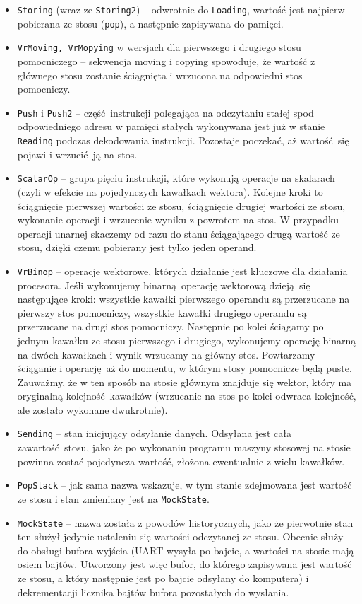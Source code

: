 \begin{itemize}
  \item \texttt{Storing} (wraz ze \texttt{Storing2}) -- odwrotnie do \texttt{Loading}, wartość jest najpierw pobierana ze stosu (\texttt{pop}), a następnie zapisywana do pamięci.
  \item \texttt{VrMoving, VrMopying} w wersjach dla pierwszego i drugiego stosu pomocniczego -- sekwencja moving i copying spowoduje, że wartość z głównego stosu zostanie ściągnięta i wrzucona na odpowiedni stos pomocniczy.
  \item \texttt{Push} i \texttt{Push2} -- część instrukcji polegająca na odczytaniu stałej spod odpowiedniego adresu w pamięci stałych wykonywana jest już w stanie \texttt{Reading} podczas dekodowania instrukcji. Pozostaje poczekać, aż wartość się pojawi i wrzucić ją na stos.
  \item \texttt{ScalarOp} -- grupa pięciu instrukcji, które wykonują operacje na skalarach (czyli w efekcie na pojedynczych kawałkach wektora). Kolejne kroki to ściągnięcie pierwszej wartości ze stosu, ściągnięcie drugiej wartości ze stosu, wykonanie operacji i wrzucenie wyniku z powrotem na stos. W przypadku operacji unarnej skaczemy od razu do stanu ściągającego drugą wartość ze stosu, dzięki czemu pobierany jest tylko jeden operand.
  \item \texttt{VrBinop} -- operacje wektorowe, których działanie jest kluczowe dla działania procesora. Jeśli wykonujemy binarną operację wektorową dzieją się następujące kroki: wszystkie kawałki pierwszego operandu są przerzucane na pierwszy stos pomocniczy, wszystkie kawałki drugiego operandu są przerzucane na drugi stos pomocniczy. Następnie po kolei ściągamy po jednym kawałku ze stosu pierwszego i drugiego, wykonujemy operację binarną na dwóch kawałkach i wynik wrzucamy na główny stos. Powtarzamy ściąganie i operację aż do momentu, w którym stosy pomocnicze będą puste. Zauważmy, że w ten sposób na stosie głównym znajduje się wektor, który ma oryginalną kolejność kawałków (wrzucanie na stos po kolei odwraca kolejność, ale zostało wykonane dwukrotnie).
  \item \texttt{Sending} -- stan inicjujący odsyłanie danych. Odsyłana jest cała zawartość stosu, jako że po wykonaniu programu maszyny stosowej na stosie powinna zostać pojedyncza wartość, złożona ewentualnie z wielu kawałków.
  \item \texttt{PopStack} -- jak sama nazwa wskazuje, w tym stanie zdejmowana jest wartość ze stosu i stan zmieniany jest na \texttt{MockState}.
  \item \texttt{MockState} -- nazwa została z powodów historycznych, jako że pierwotnie stan ten służył jedynie ustaleniu się wartości odczytanej ze stosu. Obecnie służy do obsługi bufora wyjścia (UART wysyła po bajcie, a wartości na stosie mają osiem bajtów. Utworzony jest więc bufor, do którego zapisywana jest wartość ze stosu, a który następnie jest po bajcie odsyłany do komputera) i dekrementacji licznika bajtów bufora pozostałych do wysłania.

\end{itemize}
